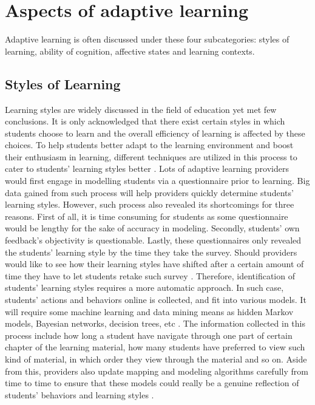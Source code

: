 \documentclass[sigconf]{acmart}
\begin{document}
\section{Aspects of adaptive learning}
Adaptive learning is often discussed under these four subcategories: styles of learning, ability of cognition, affective states and learning contexts.
\subsection{Styles of Learning}
Learning styles are widely discussed in the field of education yet met few conclusions. It is only acknowledged that there exist certain styles in which students choose to learn and the overall efficiency of learning is affected by these choices. To help students better adapt to the learning environment and boost their enthusiasm in learning, different techniques are utilized in this process to cater to students’ learning styles better \cite{Ausubel1980}.
Lots of adaptive learning providers would first engage in modelling students via a questionnaire prior to learning. Big data gained from such process will help providers quickly determine students’ learning styles. However, such process also revealed its shortcomings for three reasons. First of all, it is time consuming for students as some questionnaire would be lengthy for the sake of accuracy in modeling. Secondly, students’ own feedback’s objectivity is questionable. Lastly, these questionnaires only revealed the students’ learning style by the time they take the survey. Should providers would like to see how their learning styles have shifted after a certain amount of time they have to let students retake such survey \cite{Shute2012}. 
Therefore, identification of students’ learning styles requires a more automatic approach. In such case, students’ actions and behaviors online is collected, and fit into various models. It will require some machine learning and data mining means as hidden Markov models, Bayesian networks, decision trees, etc \cite{Paramythis2004}.  
The information collected in this process include how long a student have navigate through one part of certain chapter of the learning material, how many students have preferred to view such kind of material, in which order they view through the material and so on.  Aside from this, providers also update mapping and modeling algorithms carefully from time to time to ensure that these models could really be a genuine reflection of students’ behaviors and learning styles \cite{Hopkins1998}.
\end{document}
